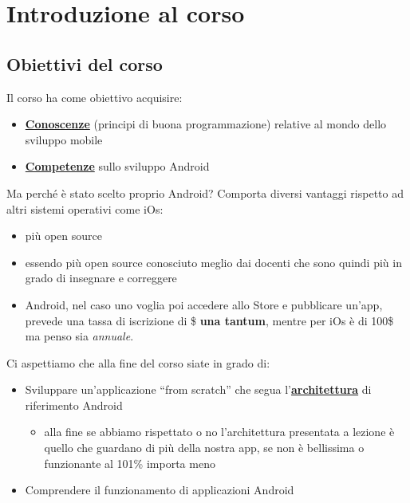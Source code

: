 
\chapter{Introduzione al corso}
\section{Obiettivi del corso}
Il corso ha come obiettivo acquisire:
\begin{itemize}
    \item \textbf{\underline{Conoscenze}} (principi di buona programmazione) relative al mondo dello sviluppo mobile
    \item \textbf{\underline{Competenze}} sullo sviluppo Android 
\end{itemize}
Ma perché è stato scelto proprio Android? Comporta diversi vantaggi rispetto ad altri sistemi operativi come iOs:
\begin{itemize}
    \item più open source
    \item essendo più open source conosciuto meglio dai docenti che sono quindi più in grado di insegnare e correggere
    \item Android, nel caso uno voglia poi accedere allo Store e pubblicare un'app, prevede una tassa di iscrizione di \$ \textbf{una tantum}, mentre per iOs è di 100\$ ma penso sia \textit{annuale}.
\end{itemize}
Ci aspettiamo che alla fine del corso siate in grado di:
\begin{itemize}
    \item Sviluppare un'applicazione ``from scratch'' che segua l'\textbf{\underline{architettura}} di riferimento Android
    \begin{itemize}
        \item alla fine se abbiamo rispettato o no l'architettura presentata a lezione è quello che guardano di più della nostra app, se non è bellissima o funzionante al 101\% importa meno
    \end{itemize}
    \item Comprendere il funzionamento di applicazioni Android
\end{itemize} 

